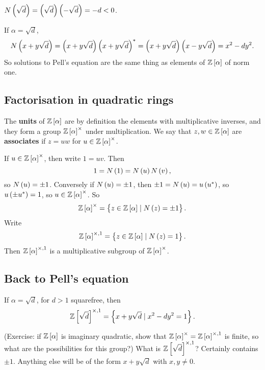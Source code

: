 \begin{example*}
$ N\br{\sqrt{d}} = \br{\sqrt{d}}\br{-\sqrt{d}} = -d < 0 $.
\end{example*}

\begin{example*}
If $ \alpha = \sqrt{d} $,
$$ N\br{x + y\sqrt{d}} = \br{x + y\sqrt{d}}\br{x + y\sqrt{d}}^* = \br{x + y\sqrt{d}}\br{x - y\sqrt{d}} = x^2 - dy^2. $$
So solutions to Pell's equation are the same thing as elements of $ \Z\sbr{\alpha} $ of norm one.
\end{example*}

\subsection{Factorisation in quadratic rings}

\begin{definition}
The \textbf{units} of $ \Z\sbr{\alpha} $ are by definition the elements with multiplicative inverses, and they form a group $ \Z\sbr{\alpha}^\times $ under multiplication. We say that $ z, w \in \Z\sbr{\alpha} $ are \textbf{associates} if $ z = uw $ for $ u \in \Z\sbr{\alpha}^\times $.
\end{definition}

If $ u \in \Z\sbr{\alpha}^\times $, then write $ 1 = uv $. Then
$$ 1 = N\br{1} = N\br{u}N\br{v}, $$
so $ N\br{u} = \pm 1 $. Conversely if $ N\br{u} = \pm 1 $, then $ \pm 1 = N\br{u} = u\br{u^*} $, so $ u\br{\pm u^*} = 1 $, so $ u \in \Z\sbr{\alpha}^\times $. So
$$ \Z\sbr{\alpha}^\times = \cbr{z \in \Z\sbr{\alpha} \mid N\br{z} = \pm 1}. $$
Write
$$ \Z\sbr{\alpha}^{\times, 1} = \cbr{z \in \Z\sbr{\alpha} \mid N\br{z} = 1}. $$
Then $ \Z\sbr{\alpha}^{\times, 1} $ is a multiplicative subgroup of $ \Z\sbr{\alpha}^\times $.

\pagebreak

\subsection{Back to Pell's equation}

\begin{example*}
If $ \alpha = \sqrt{d} $, for $ d > 1 $ squarefree, then
$$ \Z\sbr{\sqrt{d}}^{\times, 1} = \cbr{x + y\sqrt{d} \mid x^2 - dy^2 = 1}. $$
\end{example*}

(Exercise: if $ \Z\sbr{\alpha} $ is imaginary quadratic, show that $ \Z\sbr{\alpha}^\times = \Z\sbr{\alpha}^{\times, 1} $ is finite, so what are the possibilities for this group?) What is $ \Z\sbr{\sqrt{d}}^{\times, 1} $? Certainly contains $ \pm 1 $. Anything else will be of the form $ x + y\sqrt{d} $ with $ x, y \ne 0 $.

